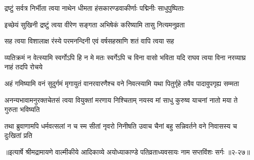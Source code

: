 \twolineshloka
{द्रष्टुं सर्वत्र निर्भीता त्वया नाथेन धीमता}
{हंसकारण्डवाकीर्णाः पद्मिनीः साधुपुष्पिताः} %

\twolineshloka
{इच्छेयं सुखिनी द्रष्टुं त्वया वीरेण सङ्गता}
{अभिषेकं करिष्यामि तासु नित्यमनुव्रता} %

\twolineshloka
{सह त्वया विशालाक्ष रंस्ये परमनन्दिनी}
{एवं वर्षसहस्राणि शतं वापि त्वया सह} %

\threelineshloka
{व्यतिक्रमं न वेत्स्यामि स्वर्गोऽपि हि न मे मतः}
{स्वर्गेऽपि च विना वासो भविता यदि राघव}
{त्वया विना नरव्याघ्र नाहं तदपि रोचये} %

\twolineshloka
{अहं गमिष्यामि वनं सुदुर्गमं मृगायुतं वानरवारणैश्च}
{वने निवत्स्यामि यथा पितुर्गृहे तवैव पादावुपगृह्य सम्मता} %

\twolineshloka
{अनन्यभावामनुरक्तचेतसं त्वया वियुक्तां मरणाय निश्चिताम्}
{नयस्व मां साधु कुरुष्व याचनां नातो मया ते गुरुता भविष्यति} %

\twolineshloka
{तथा ब्रुवाणामपि धर्मवत्सलां न च स्म सीतां नृवरो निनीषति}
{उवाच चैनां बहु सन्निवर्तने वने निवासस्य च दुःखितां प्रति} %


॥इत्यार्षे श्रीमद्रामायणे वाल्मीकीये आदिकाव्ये अयोध्याकाण्डे पतिव्रताध्यवसायः नाम सप्तविंशः सर्गः ॥२-२७॥
